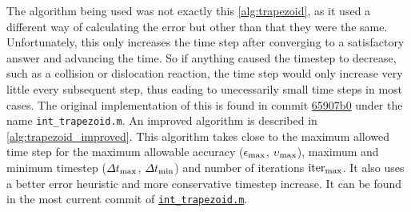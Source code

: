 The algorithm being used was not exactly this \cref{alg:trapezoid}, as it used a different way of calculating the error but other than that they were the same. Unfortunately, this only increases the time step after converging to a satisfactory answer and advancing the time. So if anything caused the timestep to decrease, such as a collision or dislocation reaction, the time step would only increase very little every subsequent step, thus eading to unecessarily small time steps in most cases. The original implementation of this is found in commit \href{https://github.com/TarletonGroup/EasyDD/blob/780a6c41b35687b443d3241674af7393d2140639/int_trapezoid.m}{65907b0} under the name \texttt{int\_trapezoid.m}. An improved algorithm is described in \cref{alg:trapezoid_improved}. This algorithm takes close to the maximum allowed time step for the maximum allowable accuracy ($\epsilon_{\textrm{max}}$, $\upsilon_{\textrm{max}}$), maximum and minimum timestep ($\Delta t_{\textrm{max}}$, $\Delta t_{\textrm{min}}$) and number of iterations $\textrm{iter}_{\textrm{max}}$. It also uses a better error heuristic and more conservative timestep increase. It can be found in the most current commit of \href{https://github.com/TarletonGroup/EasyDD/blob/master/src/int_trapezoid.m}{\texttt{int\_trapezoid.m}}.
